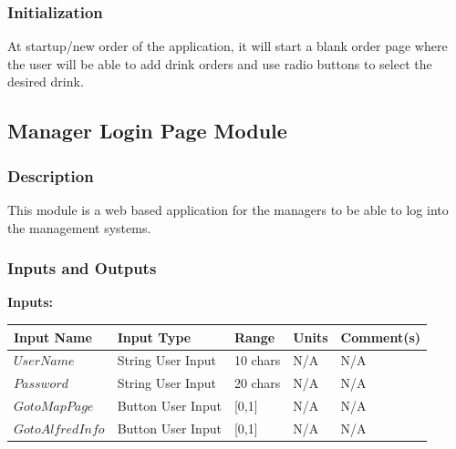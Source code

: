 \documentclass [10pt]{article}
\begin{document}
\subsubsection{Initialization}
At startup/new order of the application, it will start a blank order page where the user will be able to add drink orders and use radio buttons to select the desired drink.


\subsection{Manager Login Page Module}


\subsubsection{Description}
This module is a web based application for the managers to be able to log into the management systems.


\subsubsection{Inputs and Outputs}

\textbf{Inputs: } \newline

\begin{longtable}{|l|l|l|l|l|}\hline 
	\rowcolor{tableCell}\textbf{Input Name} & \textbf{Input Type} & \textbf{Range} & \textbf{Units} & \textbf{Comment(s)} \\ \hline
	$  UserName $ & String User Input & 10 chars & N/A & N/A\\ \hline
	\rowcolor{tableCell}$  Password $ & String User Input & 20 chars  & N/A & N/A\\ \hline
	$  GotoMapPage $ & Button User Input & [0,1]  & N/A & N/A\\ \hline
	\rowcolor{tableCell}$  GotoAlfredInfo $ & Button User Input & [0,1]  & N/A & N/A\\ \hline
\end{longtable}
\end{document}

